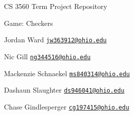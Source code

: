 CS 3560 Term Project Repository

Game\+: Checkers

Jordan Ward \href{mailto:jw363912@ohio.edu}{\tt jw363912@ohio.\+edu}

Nic Gill \href{mailto:ng344516@ohio.edu}{\tt ng344516@ohio.\+edu}

Mackenzie Schnaekel \href{mailto:ms840314@ohio.edu}{\tt ms840314@ohio.\+edu}

Dashaun Slaughter \href{mailto:ds946041@ohio.edu}{\tt ds946041@ohio.\+edu}

Chase Gindlesperger \href{mailto:cg197415@ohio.edu}{\tt cg197415@ohio.\+edu} 